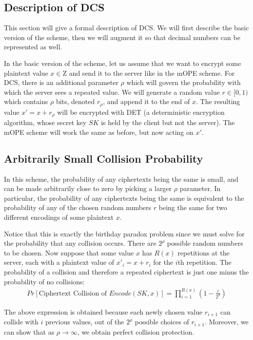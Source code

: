 \documentclass[12pt]{article}
\begin{document}
\subsection{Description of DCS}

This section will give a formal description of DCS. We will first describe the basic version of the scheme, then we will augment it so that decimal numbers can be represented as well.

In the basic version of the scheme, let us assume that we want to encrypt some plaintext value $x \in \mathrm{Z}$ and send it to the server like in the mOPE scheme. For DCS, there is an additional parameter $\rho$ which will govern the probability with which the server sees a repeated value. We will generate a random value $r \in [0,1)$ which contains $\rho$ bits, denoted $r_{\rho}$, and append it to the end of $x$. The resulting value $x' = x + r_{\rho}$ will be encrypted with DET (a deterministic encryption algorithm, whose secret key $SK$ is held by the client but not the server). The mOPE scheme will work the same as before, but now acting on $x'$.

\subsection{Arbitrarily Small Collision Probability}

In this scheme, the probability of any ciphertexts being the same is small, and can be made arbitrarily close to zero by picking a larger $\rho$ parameter. In particular, the probability of any ciphertexts being the same is equivalent to the probability of any of the chosen random numbers $r$ being the same for two different encodings of some plaintext $x$.

Notice that this is exactly the birthday paradox problem since we must solve for the probability that any collision occurs. There are $2^\rho$ possible random numbers to be chosen. Now suppose that some value $x$ has $R(x)$ repetitions at the server, each with a plaintext value of $x'_i = x + r_i$ for the $i$th repetition. The probability of a collision and therefore a repeated ciphertext is just one minus the probability of no collisions:
\begin{eqnarray}
  Pr[\textrm{Ciphertext Collision of } Encode(SK, x)] = \prod_{i=1}^{R(x)} \left(1 - \frac{i}{2^{\rho}} \right)
\end{eqnarray}

The above expression is obtained because each newly chosen value $r_{i+1}$ can collide with $i$ previous values, out of the $2^{\rho}$ possible choices of $r_{i+1}$. Moreover, we can show that as $\rho \to \infty$, we obtain perfect collision protection. \\
\end{document}
